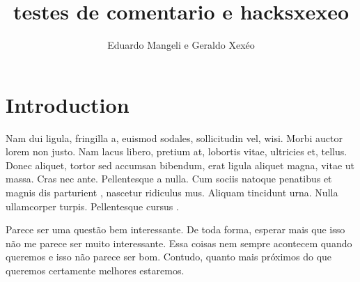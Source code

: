\documentclass{article}
\title{testes de comentario e hacksxexeo}
\author{Eduardo Mangeli e Geraldo Xexéo}
\begin{document}
\listofcomentario

\maketitle

\section{Introduction}

%
%
%
%



Nam dui ligula, fringilla a, euismod sodales, sollicitudin vel, wisi.  Morbi
auctor lorem non justo. Nam lacus libero, pretium at, lobortis vitae, ultricies et,
tellus. Donec aliquet, tortor sed accumsan bibendum, erat ligula aliquet magna,
vitae  
ut massa. Cras nec ante. Pellentesque a nulla. Cum sociis natoque penatibus et
magnis dis parturient , nascetur ridiculus mus. Aliquam tincidunt urna.
Nulla ullamcorper  turpis. Pellentesque cursus .




Parece ser uma questão bem interessante. De toda forma, esperar mais que isso não me parece ser muito interessante. Essa coisas nem sempre acontecem quando queremos e isso não parece ser bom. Contudo, quanto mais próximos do que queremos certamente melhores estaremos.



\end{document}
